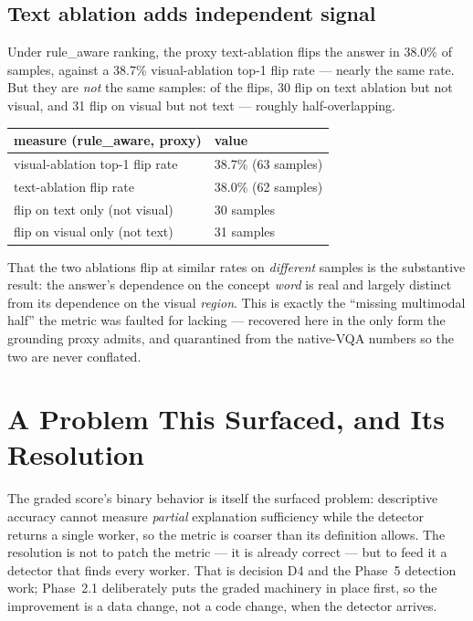 \subsection{Text ablation adds independent signal}

Under rule\_aware ranking, the proxy text-ablation flips the answer in 38.0\% of samples, against a
38.7\% visual-ablation top-1 flip rate --- nearly the same rate. But they are \emph{not} the same
samples: of the flips, 30 flip on text ablation but not visual, and 31 flip on visual but not text ---
roughly half-overlapping.

\begin{center}
\begin{tabular}{p{6.4cm}p{4.0cm}}
\toprule
\textbf{measure (rule\_aware, proxy)} & \textbf{value} \\
\midrule
visual-ablation top-1 flip rate & 38.7\% (63 samples) \\
text-ablation flip rate         & 38.0\% (62 samples) \\
flip on text only (not visual)  & 30 samples \\
flip on visual only (not text)  & 31 samples \\
\bottomrule
\end{tabular}
\label{tab:p21-textabl}
\end{center}

That the two ablations flip at similar rates on \emph{different} samples is the substantive result: the
answer's dependence on the concept \emph{word} is real and largely distinct from its dependence on the
visual \emph{region}. This is exactly the ``missing multimodal half'' the metric was faulted for
lacking --- recovered here in the only form the grounding proxy admits, and quarantined from the
native-VQA numbers so the two are never conflated.

\section{A Problem This Surfaced, and Its Resolution}

The graded score's binary behavior is itself the surfaced problem: descriptive accuracy cannot measure
\emph{partial} explanation sufficiency while the detector returns a single worker, so the metric is
coarser than its definition allows. The resolution is not to patch the metric --- it is already correct
--- but to feed it a detector that finds every worker. That is decision D4 and the Phase~5 detection
work; Phase~2.1 deliberately puts the graded machinery in place first, so the improvement is a data
change, not a code change, when the detector arrives.

